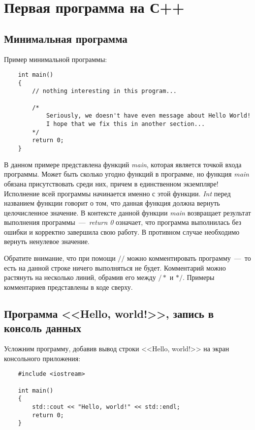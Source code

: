 \section{Первая программа на С++}
\subsection{Минимальная программа}

Пример минимальной программы:

\lstset{style=CPlusPlus}
\begin{lstlisting}
    int main()
    {
        // nothing interesting in this program...
        
        /*
            Seriously, we doesn't have even message about Hello World!
            I hope that we fix this in another section...
        */
        return 0;
    }
\end{lstlisting}

В данном примере представлена функций \textit{main}, которая является точкой входа программы. Может быть сколько угодно функций в программе, но функция \textit{main} обязана присутствовать среди них, причем в единственном экземпляре! Исполнение всей программы начинается именно с этой функции. \textit{Int} перед названием функции говорит о том, что данная функция должна вернуть целочисленное значение. В контексте данной функции \textit{main} возвращает результат выполнения программы~---~\textit{return 0} означает, что программа выполнилась без ошибки и корректно завершила свою работу. В противном случае необходимо вернуть ненулевое значение.

Обратите внимание, что при помощи $//$ можно комментировать программу~---~то есть на данной строке ничего выполняться не будет. Комментарий можно растянуть на несколько линий, обрамив его между $/*$ и $*/$. Примеры комментариев представлены в коде сверху.

\subsection{Программа <<Hello, world!>>, запись в консоль данных}

Усложним программу, добавив вывод строки <<Hello, world!>> на экран консольного приложения:

\begin{lstlisting}
    #include <iostream>

    int main()
    {
        std::cout << "Hello, world!" << std::endl;
        return 0;
    }
\end{lstlisting}

